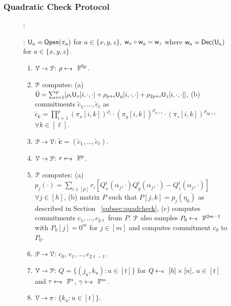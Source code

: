 \subsubsection{Quadratic Check Protocol}

\begin{figure}[h!]
	{\footnotesize
		\begin{framed}
			:
			
			: $\ewit_a=\open(\pi_a)$ for $a\in \{x,y,z\}$, $\wit_x \circ \wit_y = \wit_z$ where  $\wit_a=\dec(\ewit_a)$ for $a\in \{x,y,z\}$.
			
			\begin{enumerate}[{\rm 1.}]
				\item $\verifier\rightarrow\prover$: $\rho\sample \FF^{3p}$.
				\item $\prover$ computes: (a) $\tilde{\ewit}=\sum_{i=1}^p[\rho_i\ewit_x[i,\cdot,\cdot] + \rho_{p+i}\ewit_y[i,\cdot,\cdot]+\rho_{2p+i}\ewit_z[i,\cdot,\cdot]]$, (b)
				commitments $\tilde{c}_1,\ldots,\tilde{c}_\ell$ as $\tilde{c}_k = \prod_{i=1}^{p} (\pi_x[i,k])^{\rho_i}\cdot (\pi_y[i,k])^{\rho_{p+i}}\cdot(\pi_z[i,k])^{\rho_{2p+i}}$ $\forall k\in[\ell]$.
				\item $\prover\rightarrow\verifier$: $\tilde{\bm{c}}=(\tilde{c}_1,\ldots,\tilde{c}_\ell)$.
				\item $\verifier\rightarrow\prover$: $r\sample \FF^p$.
				\item $\prover$ computes: (a) $p_j(\cdot) = \sum_{i\in[p]} r_i[Q^i_x(\alpha_j,\cdot)Q^i_y(\alpha_j,\cdot) - Q^i_z(\alpha_j,\cdot)]$ $\forall j\in [h]$, (b) matrix $P$ such that $P[j,k] = p_j(\eta_k)$ as described in Section ~\ref{subsec:quadcheck}, (c) computes commitments $c_1,\ldots,c_{2\ell}$ from $P$. $\prover$ also samples $P_0\sample \FF^{2m-1}$ with $P_0[j]=0^m$ for $j\in[m]$ and computes commitment $c_0$ to $P_0$.
				\item $\prover\rightarrow\verifier$: $c_0$, $c_1,\ldots,c_{2\ell-1}$.
				\item $\verifier\rightarrow\prover$: $Q=\{(j_u,k_u):u\in [t]\}$ for $Q\sample [h]\times [n]$, $u\in [t]$ and $\tau \sample \FF^s$, $\gamma \sample \FF^m$.
				\item $\verifier\rightarrow\pi$: $\{k_u:u\in [t]\}$.

\end{enumerate}
\end{framed}}
\end{figure}
